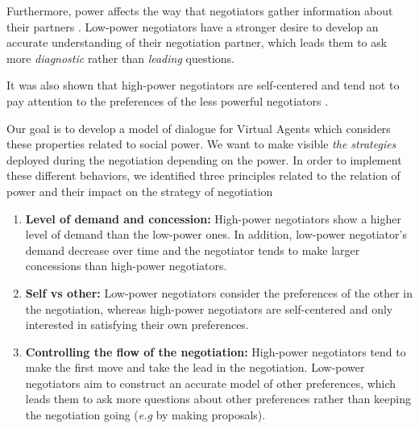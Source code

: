 \documentclass{llncs}
\begin{document}
	Furthermore, power affects the way that negotiators gather information about their partners \cite{de2004influence}. Low-power negotiators have a stronger desire to develop an accurate understanding of their negotiation partner, which leads them to ask more \emph{diagnostic} rather than \emph{leading} questions.
	
	It was also shown that high-power negotiators are self-centered and tend  not to pay attention to the preferences of the less powerful negotiators \cite{fiske1993controlling,de1995impact}.
	
	Our goal is to develop a model of dialogue for Virtual Agents which considers these properties related to social power. We want to make visible \emph{the strategies} deployed during the negotiation depending on the power. In order to implement these different behaviors, we identified three principles related to the relation of power and their impact on the strategy of negotiation
	\begin{enumerate}
		\item \textbf{Level of demand and concession:} High-power negotiators show a higher level of demand than the low-power ones. In addition, low-power negotiator's demand decrease over time and the negotiator tends to make larger concessions than high-power negotiators. \cite{de1995impact}
		
		\item \textbf{Self vs other:} Low-power negotiators consider the preferences of the other in the negotiation, whereas high-power negotiators are self-centered and only interested in satisfying their own preferences. \cite{fiske1993controlling,de1995impact}
		
		\item \textbf{Controlling the flow of the negotiation:}
		High-power negotiators tend to make the first move \cite{magee2007power} and take the lead in the negotiation. Low-power negotiators aim to construct an accurate model of other preferences, which leads them to ask more questions about other preferences rather than keeping the negotiation going (\emph{e.g} by making proposals)\cite{de2004influence}. 
		
	\end{enumerate}
	
\end{document}
